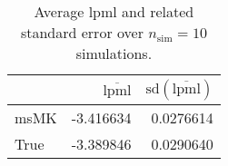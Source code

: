 \begin{table}[H]

\caption{Average lpml and related standard error over $n_{\text{sim}} = 10$ simulations.}
\centering
\begin{tabular}[t]{lrr}
\toprule
  & $\overbar{\text{lpml}}$ & $\text{sd}(\overbar{\text{lpml}})$\\
\midrule
msMK & -3.416634 & 0.0276614\\
True & -3.389846 & 0.0290640\\
\bottomrule
\end{tabular}
\end{table}